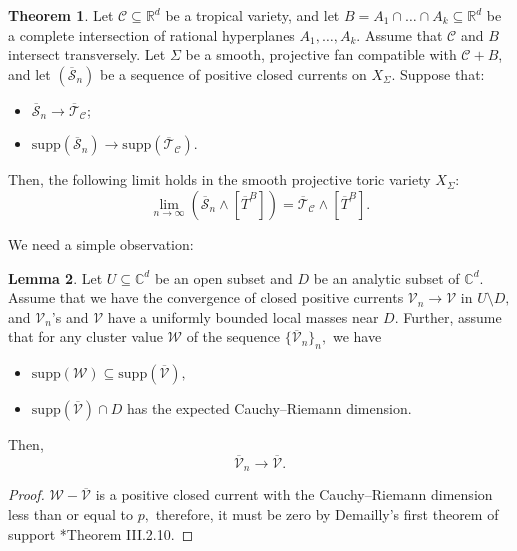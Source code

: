 \documentclass[11pt]{amsart}
\theoremstyle{definition}
\newtheorem{theorem}{Theorem}[section]
\newtheorem{lemma}[theorem]{Lemma}
\newcommand{\lto}{\longrightarrow}
\newcommand{\C}{\mathbb{C}}
\newcommand{\sW}{\mathscr{W}}
\newcommand{\sV}{\mathscr{V}}
\newcommand{\supp}[1]{{\mathrm{supp}(#1)}}
\begin{document}
\begin{theorem}\label{thm:limit-closure}
Let $\mathcal{C} \subseteq \mathbb{R}^d$ be a tropical variety, and let $B = A_1 \cap \dots \cap A_k \subseteq \mathbb{R}^d$ be a complete intersection of rational hyperplanes $A_1, \dots, A_k$. Assume that $\mathcal{C}$ and $B$ intersect transversely. Let $\Sigma$ be a smooth, projective fan compatible with $\mathcal{C} + B$, and let $(\overline{\mathscr{S}}_n)$ be a sequence of positive closed currents on $X_{\Sigma}$. Suppose that:
\begin{itemize}
    \item[(a)] $\overline{\mathscr{S}}_n \lto \overline{\mathscr{T}}_{\mathcal{C}}$;
    \item[(b)] $\supp{\overline{\mathscr{S}}_n} \lto \supp{\overline{\mathscr{T}}_{\mathcal{C}}}$.
\end{itemize}

Then, the following limit holds in the smooth projective toric variety $X_{\Sigma}$:
\[
\lim_{n \to \infty} \left(\overline{\mathscr{S}}_n \wedge [\overline{T}^{B}]\right) = \overline{\mathscr{T}}_{\mathcal{C}} \wedge [\overline{T}^B].
\]
\end{theorem}
We need a simple observation:
\begin{lemma}\label{lem:closure}
 Let $U \subseteq \C^d$ be an open subset and $D$ be an analytic subset of $\C^d.$  Assume that we have the convergence of closed positive currents $\sV_n \lto \sV$ in $U\setminus D,$ and $\sV_n$'s and $\sV$ have a uniformly bounded local masses near $D.$ Further, assume that for any cluster value $\sW$ of the sequence $\{\overline{\sV}_n\}_n,$  we have
 \begin{itemize}
     \item [(a)] $\supp{\sW}\subseteq \supp{\overline{\sV}},$
     \item [(b)] $\supp{\overline{\sV}} \cap D$ has the expected Cauchy--Riemann dimension.
 \end{itemize} 
 Then, 
 $$\overline{\sV}_n \lto \overline{\sV}.$$
\end{lemma}

\begin{proof}
$\sW -\overline{\sV}$ is a positive closed current with the Cauchy--Riemann dimension less than or equal to $p,$ therefore, it must be zero by Demailly's first theorem of support  \cite{DemaillyBook1}*{Theorem III.2.10}.
\end{proof}
\end{document}
